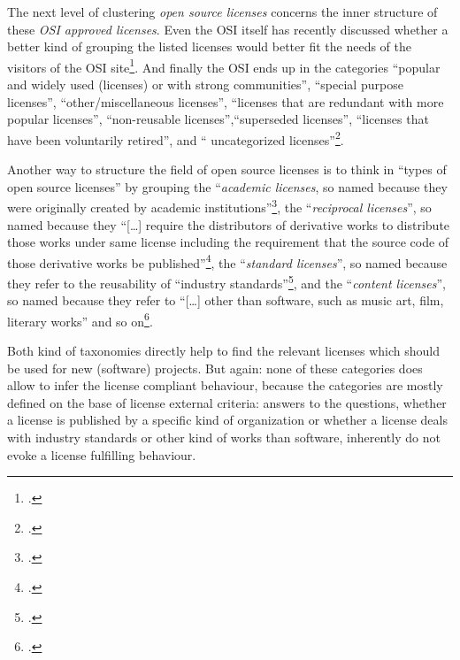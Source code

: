 The next level of clustering \emph{open source licenses} concerns the inner
structure of these \emph{OSI approved licenses}. Even the OSI itself has recently
discussed whether a better kind of grouping the listed licenses would better fit
the needs of the visitors of the OSI site\footcite[cf.][\nopage wp]{OSI2013a}.
And finally the OSI ends up in the categories \enquote{popular and widely used
(licenses) or with strong communities}, \enquote{special purpose licenses},
\enquote{other/miscellaneous licenses}, \enquote{licenses that are redundant
with more popular licenses}, \enquote{non-reusable licenses},\enquote{superseded
licenses}, \enquote{licenses that have been voluntarily retired}, and \enquote{
uncategorized licenses}\footcite[cf.][\nopage wp]{OSI2013b}.

Another way to structure the field of open source licenses is to think in
\enquote{types of open source licenses} by grouping the \enquote{\emph{academic
licenses}, so named because they were originally created by academic
institutions}\footcite[cf.][69]{Rosen2005a}, the \enquote{\emph{reciprocal
licenses}}, so named because they \enquote{[\ldots] require the distributors of
derivative works to dis\-tri\-bu\-te those works under same license including the
requirement that the source code of those derivative works be
published}\footcite[cf.][70]{Rosen2005a}, the \enquote{\emph{standard
licenses}}, so named because they refer to the reusability of \enquote{industry
standards}\footcite[cf.][70]{Rosen2005a}, and the \enquote{\emph{content
licenses}}, so named because they refer to
\enquote{[\ldots] other than software, such as music art, film, literary works}
and so on\footcite[cf.][71]{Rosen2005a}.

Both kind of taxonomies directly help to find the relevant licenses which should
be used for new (software) projects. But again: none of these categories does
allow to infer the license compliant behaviour, because the categories are
mostly defined on the base of license external criteria: answers to the
questions, whether a license is published by a specific kind of organization or
whether a license deals with industry standards or other kind of works than
software, inherently do not evoke a license fulfilling behaviour.

